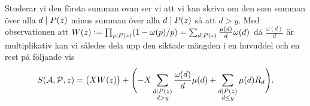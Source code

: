 Studerar vi den första summan ovan ser vi att vi kan skriva om den som summan över alla \(d \mid P(z)\) minus summan över alla \(d \mid P(z)\) så att \(d > y\).
Med observationen att \(W(z) := \prod_{p \mid P(z)} (1 - \omega(p)/p) = \sum_{d \mid P(z)} \frac{\mu(d)}{d} \omega(d)\) då \(\frac{\omega(d)}{d}\) är multiplikativ kan vi således dela upp den siktade mängden i en huvuddel och en rest på följande vis
\begin{align*}
    S(\mathcal{A}, \mathcal{P}, z) = \left(X W(z) \right) + \Biggl(- X \sum_{\substack{d \mid P(z) \\ d > y}} \frac{\omega(d)}{d} \mu(d) + \sum_{\substack{d \mid P(z)  \\ d \leq y}} \mu(d) R_d \Biggr).
\end{align*}

